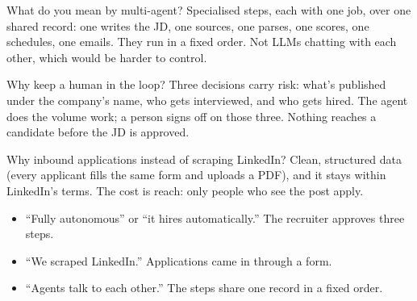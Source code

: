 \begin{iq}[\core]{What do you mean by multi-agent?}
Specialised steps, each with one job, over one shared record: one writes the JD, one sources, one parses, one scores, one schedules, one emails. They run in a fixed order. Not LLMs chatting with each other, which would be harder to control.
\end{iq}

\begin{iq}[\core]{Why keep a human in the loop?}
Three decisions carry risk: what's published under the company's name, who gets interviewed, and who gets hired. The agent does the volume work; a person signs off on those three. Nothing reaches a candidate before the JD is approved.
\end{iq}

\begin{iq}{Why inbound applications instead of scraping LinkedIn?}
Clean, structured data (every applicant fills the same form and uploads a PDF), and it stays within LinkedIn's terms. The cost is reach: only people who see the post apply.
\end{iq}

\begin{bugfix}
\begin{itemize}
  \item ``Fully autonomous'' or ``it hires automatically.'' The recruiter approves three steps.
  \item ``We scraped LinkedIn.'' Applications came in through a form.
  \item ``Agents talk to each other.'' The steps share one record in a fixed order.
\end{itemize}
\end{bugfix}
